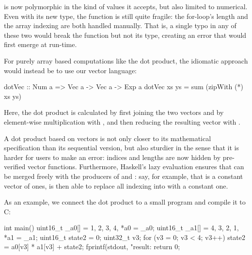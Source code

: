 \documentclass[../paper.tex]{subfiles}
\begin{document}
\noindent {} is now polymorphic in the kind of values it accepts, but also limited to numerical. Even with its new type, the function is still quite fragile: the for-loop's length and the array indexing are both handled manually. That is, a single typo in any of these two would break the function but not its type, creating an error that would first emerge at run-time.

For purely array based computations like the dot product, the idiomatic approach would instead be to use our vector language:


\begin{code}
dotVec :: Num a => Vec a -> Vec a -> Exp a
dotVec xs ys = sum (zipWith (*) xs ys)
\end{code}

\noindent Here, the dot product is calculated by first joining the two vectors  and  by element-wise multiplication with , and then reducing the resulting vector with .


A dot product based on vectors is not only closer to its mathematical specification than its sequential version, but also sturdier in the sense that it is harder for users to make an error: indices and lengths are now hidden by pre-verified vector functions. Furthermore, Haskell's lazy evaluation ensures that  can be merged freely with the producers of  and : say, for example, that  is a constant vector of ones,  is then able to replace all indexing into  with a constant one.

As an example, we connect the dot product to a small program and compile it to C:

\begin{code}
int main() {
  uint16_t _a0[] = {1, 2, 3, 4}, *a0 = _a0;
  uint16_t _a1[] = {4, 3, 2, 1}, *a1 = _a1;
  uint16_t state2 = 0;
  uint32_t v3;
  for (v3 = 0; v3 < 4; v3++)
    state2 = a0[v3] * a1[v3] + state2;
  fprintf(stdout, "result: %
  return 0;
}
\end{code}
\end{document}
